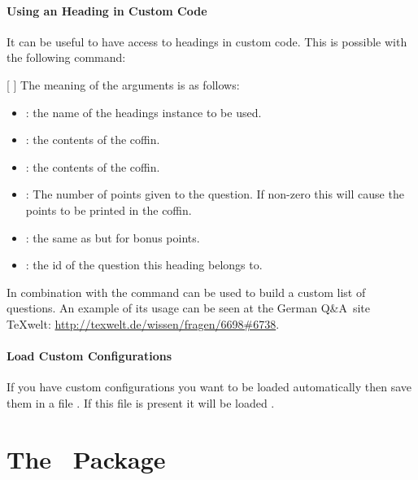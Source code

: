 \documentclass[load-preamble+,scrartcl={DIV10}]{cnltx-doc}
\begin{document}
\subsection{Using an \ExSheets{} Heading in Custom Code}\label{sec:using-an-exsheets}

It can be useful to have access to \ExSheets{} headings in custom code.  This
is possible with the following command:

\begin{commands}
  [%
    ]
    The meaning of the arguments is as follows:
    \begin{itemize}
      \item {}: the name of the headings instance to be used.
      \item {}: the contents of the  coffin.
      \item {}: the contents of the  coffin.
      \item {}: The number of points given to the question.  If
        non-zero this will cause the points to be printed in the 
        coffin.
      \item {}: the same as  but for bonus points.
      \item {}: the \acs{id} of the question this heading belongs to.
    \end{itemize}
\end{commands}

In combination with  the command can be used to build a
custom list of questions.  An example of its usage can be seen at the German
Q\&A~site \TeX welt: \url{http://texwelt.de/wissen/fragen/6698#6738}.

\subsection{Load Custom Configurations}
If you have custom configurations you want to be loaded automatically then save
them in a file . If this file is present it
will be loaded .


\part{The \ExSheetslistings\ Package}\label{part:listings}
\end{document}
